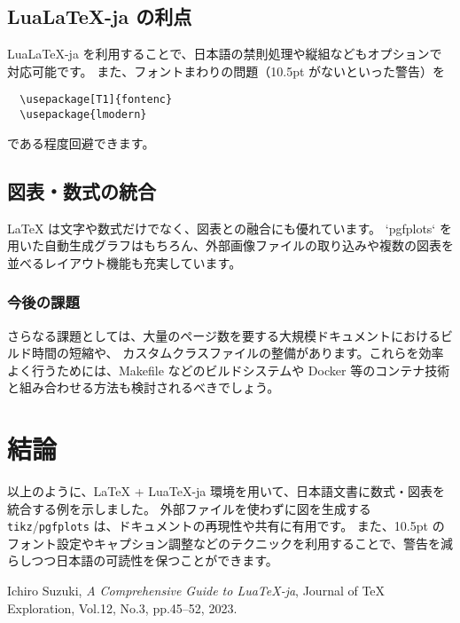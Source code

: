 \documentclass[a4paper,10.5pt]{ltjsarticle}
\begin{document}
\subsection{Lua\LaTeX-ja の利点}
Lua\LaTeX-ja を利用することで、日本語の禁則処理や縦組などもオプションで対応可能です。
また、フォントまわりの問題（10.5pt がないといった警告）を 
\begin{verbatim}
  \usepackage[T1]{fontenc}
  \usepackage{lmodern}
\end{verbatim}
である程度回避できます。

\subsection{図表・数式の統合}
LaTeX は文字や数式だけでなく、図表との融合にも優れています。
`pgfplots` を用いた自動生成グラフはもちろん、外部画像ファイルの取り込みや複数の図表を並べるレイアウト機能も充実しています。

\subsubsection{今後の課題}
さらなる課題としては、大量のページ数を要する大規模ドキュメントにおけるビルド時間の短縮や、
カスタムクラスファイルの整備があります。これらを効率よく行うためには、Makefile などのビルドシステムや
Docker 等のコンテナ技術と組み合わせる方法も検討されるべきでしょう。

\section{結論}
以上のように、LaTeX + LuaTeX-ja 環境を用いて、日本語文書に数式・図表を統合する例を示しました。  
外部ファイルを使わずに図を生成する \texttt{tikz}/\texttt{pgfplots} は、ドキュメントの再現性や共有に有用です。  
また、10.5pt のフォント設定やキャプション調整などのテクニックを利用することで、警告を減らしつつ日本語の可読性を保つことができます。

\clearpage
{}
\begin{thebibliography}{99}

Ichiro Suzuki,
\textit{A Comprehensive Guide to LuaTeX-ja},
Journal of TeX Exploration, Vol.12, No.3, pp.45--52, 2023.

\end{thebibliography}
\end{document}
